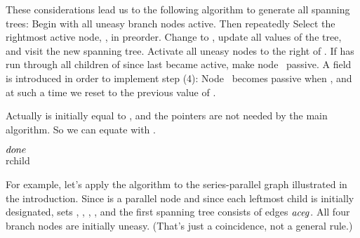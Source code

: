 These considerations lead us to the following algorithm to generate
all spanning trees: Begin with all uneasy branch nodes active. Then
repeatedly
\smallskip{} Select the rightmost active node, , in
preorder.
\smallskip{} Change  to , update all values
of the tree, and visit the new spanning tree.
\smallskip{} Activate all uneasy nodes to the right of .
\smallskip{} If  has run through all children of
since  last became active, make node~ passive.
\smallskip\noindent
A field  is introduced in order to implement step (4):
Node~
becomes passive when , and at such a time
we reset
 to the previous value of .

Actually  is initially equal to ,
and the 
pointers are not needed by the main algorithm. So we can equate
 with .

\Y\B\4\D$\\{done}$ \5
\\{rchild}\par
\fi

For example, let's apply the algorithm to the series-parallel graph
illustrated in the introduction. Since  is a parallel node and since
each leftmost child is initially designated,  sets
, , , , and the first spanning
tree consists of edges $\it aceg$. All four branch nodes are initially
uneasy. (That's just a coincidence, not a general rule.)

